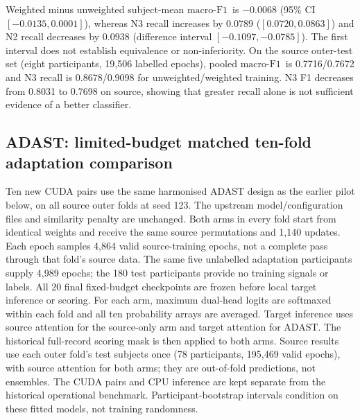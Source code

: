 \documentclass[10pt,a4paper]{article}
\newcommand{\mf}{\ensuremath{\mathrm{macro\text{-}F1}}}
\newcommand{\ci}{95\% CI}
\begin{document}
Weighted minus unweighted subject-mean \mf\ is $-0.0068$ (\ci\ $[-0.0135,0.0001]$),
whereas N3 recall increases by $0.0789$ ($[0.0720,0.0863]$) and N2 recall decreases by
$0.0938$ (difference interval $[-0.1097,-0.0785]$). The first interval does not establish
equivalence or non-inferiority. On the source outer-test set (eight participants, 19,506 labelled
epochs), pooled \mf\ is 0.7716/0.7672 and N3 recall is 0.8678/0.9098 for unweighted/weighted
training. N3 F1 decreases from 0.8031 to 0.7698 on source, showing that greater recall alone is
not sufficient evidence of a better classifier.

\subsection*{ADAST: limited-budget matched ten-fold adaptation comparison}

Ten new CUDA pairs use the same harmonised ADAST design as the earlier pilot below,
on all source outer folds at seed 123. The upstream model/configuration files and similarity
penalty are unchanged. Both arms in every fold start from identical weights and receive the
same source permutations and 1,140 updates. Each epoch samples 4,864 valid source-training
epochs, not a complete pass through that fold's source data. The same five unlabelled adaptation
participants supply 4,989 epochs; the 180 test participants provide no training signals or labels.
All 20 final fixed-budget checkpoints are frozen before local target inference or scoring.
For each arm, maximum dual-head logits are softmaxed within each fold and all ten probability
arrays are averaged. Target inference uses source attention for the source-only arm and target
attention for ADAST. The historical full-record scoring mask is then applied to both arms.
Source results use each outer fold's test subjects once (78 participants, 195,469 valid epochs),
with source attention for both arms; they are out-of-fold predictions, not ensembles.
The CUDA pairs and CPU inference are kept separate from the historical operational benchmark.
Participant-bootstrap intervals condition on these fitted models, not training randomness.
\end{document}
